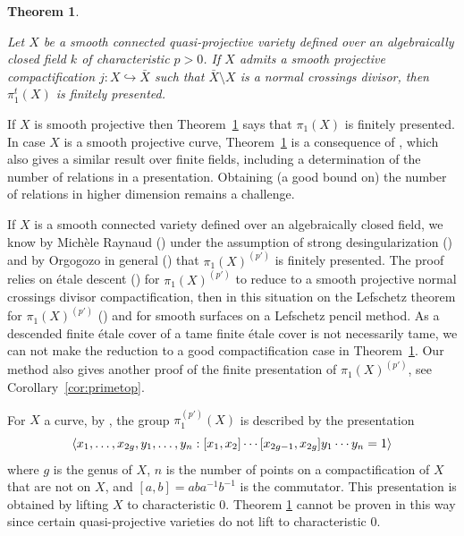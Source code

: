 \documentclass[12pt]{amsart}
\theoremstyle{plain}
\newtheorem{thm}{Theorem}
\theoremstyle{definition}
\numberwithin{thm}{section}
\numberwithin{equation}{section}
\begin{document}
\begin{thm} \label{thm:main}

Let $X$ be a smooth connected quasi-projective variety defined over an algebraically closed field $k$ of characteristic $p>0$.   
If $X$ admits a smooth projective compactification $j: X\hookrightarrow \bar X$ such that $\bar X\setminus X$ is a normal crossings divisor, then $\pi_1^t(X)$ is finitely presented.
\end{thm}

If $X$ is smooth projective then  Theorem~\ref{thm:main}   says that $\pi_1(X)$ is finitely presented. 
In case $X$ is a smooth projective curve, Theorem~\ref{thm:main} 
is a consequence of \cite[Corollary 1.2]{Shu18}, which also gives a similar result over finite fields, including a determination of the number of relations in a presentation.
Obtaining (a good bound on) the number of relations in higher dimension remains a challenge.  




If $X$ is a smooth connected variety defined over an algebraically closed field, we know 
by  Mich\`ele
Raynaud  (\cite[Th\'eor\`eme~2.3.1, Remarque~2.3.2]{Ray72}) under the assumption of strong desingularization
(\cite[I 3.1.5]{SGA5}) and by Orgogozo in general (\cite[Th\'eor\`eme~4.11]{Org03}) that $\pi_1(X)^{(p')}$ is finitely presented.  The proof relies on \'etale descent (\cite[Expos\'e IX, Th\'eor\`eme~4.10]{SGA1})  for $\pi_1(X)^{(p')}$  to reduce to a smooth projective normal crossings divisor compactification, 
then in this situation on the Lefschetz theorem for $\pi_1(X)^{(p')}$ (\cite[Remarque~4.3]{Ray74}) and for smooth surfaces on a Lefschetz pencil method. As  a descended finite \'etale cover of a tame finite \'etale cover is not necessarily tame, we can  not make the reduction to a good compactification case in Theorem~\ref{thm:main}. Our method also gives another proof of the finite presentation of $\pi_1(X)^{(p')}$, see Corollary~\ref{cor:primetop}.









For $X$ a curve, by \cite[Expos\'e XIII, Corollaire~2.12]{SGA1}, the group $\pi_1^{(p')}(X)$ is described by the presentation
\begin{equation}
\langle x_1, \dots, x_{2g}, y_1, \dots ,y_n : [x_1,x_2] \cdots [x_{2g-1}, x_{2g}] y_1 \cdots y_n = 1 \rangle
\notag
\end{equation}
where $g$ is the genus of $X$, $n$ is the number of points on a compactification of $X$ that are not on $X$, and $[a,b] = aba^{-1}b^{-1}$ is the commutator.
This presentation is obtained by lifting $X$ to characteristic $0$.
Theorem \ref{thm:main}  cannot be proven in this way since certain quasi-projective varieties do not lift to characteristic $0$.
\end{document}
